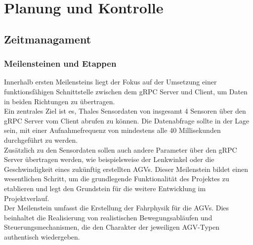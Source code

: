 \chapter{Planung und Kontrolle}


\section{Zeitmanagament}

\subsection{Meilensteinen und Etappen}
Innerhalb ersten Meilensteins liegt der Fokus auf der Umsetzung einer funktionsfähigen Schnittstelle zwischen dem gRPC Server und Client, um Daten in beiden Richtungen zu übertragen. \\
Ein zentrales Ziel ist es, Thales Sensordaten von insgesamt 4 Sensoren über den gRPC Server vom Client abrufen zu können. Die Datenabfrage sollte in der Lage sein, mit einer Aufnahmefrequenz von mindestens alle 40 Millisekunden durchgeführt zu werden.\\
Zusätzlich zu den Sensordaten sollen auch andere Parameter über den gRPC Server übertragen werden, wie beispielsweise der Lenkwinkel oder die Geschwindigkeit eines zukünftig erstellten AGVs. Dieser Meilenstein bildet einen wesentlichen Schritt, um die grundlegende Funktionalität des Projektes zu etablieren und legt den Grundstein für die weitere Entwicklung im Projektverlauf.\\
Der Meilenstein umfasst die Erstellung der Fahrphysik für die AGVs. Dies beinhaltet die Realisierung von realistischen Bewegungsabläufen und Steuerungsmechanismen, die den Charakter der jeweiligen AGV-Typen authentisch wiedergeben.\\
